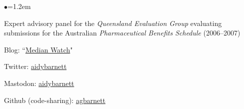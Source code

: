 \documentclass[a4paper,11pt]{article}
\renewcommand{\labelitemi}{$\bullet$}
\begin{document}
\begin{raggedright}
\begin{list}{\labelitemi}{\leftmargin=1.2em}
\item Expert advisory panel for the \textit{Queensland Evaluation Group} evaluating submissions for the Australian \textit{Pharmaceutical Benefits Schedule} (2006--2007)
\item Blog: ``\href{https://medianwatch.netlify.com/}{Median Watch}"
\item Twitter: \href{https://twitter.com/aidybarnett}{aidybarnett}
\item Mastodon: \href{https://fediscience.org/@aidybarnett}{aidybarnett}
\item Github (code-sharing): \href{https://github.com/agbarnett}{agbarnett}
\end{list}


\end{raggedright}
\end{document}
